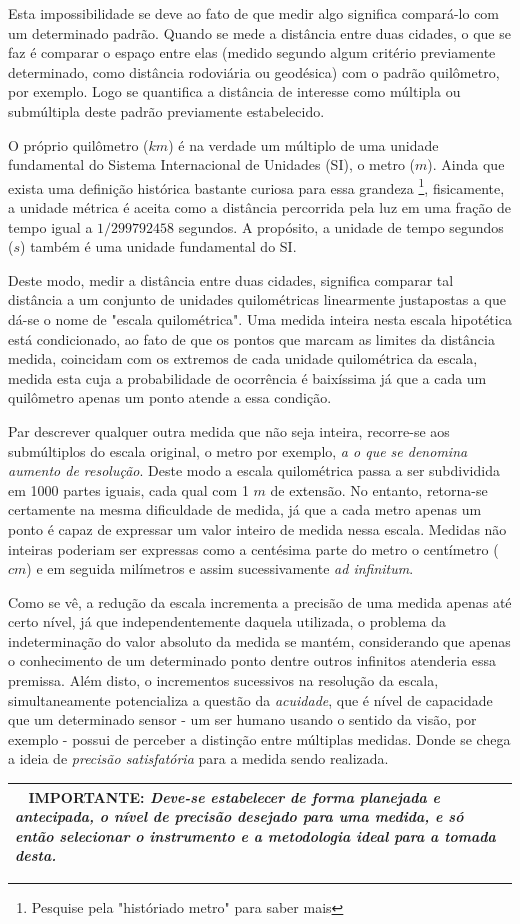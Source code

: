 \documentclass[a4paper, 11pt]{report}
\newenvironment{myboxed}
    {
        \begin{center}
        \begin{tabular}{p{0.7\textwidth}}
        \hline\
    }
    { 
        \\\hline
        \end{tabular} 
        \end{center}
    }
\begin{document}
Esta impossibilidade se deve ao fato de que medir algo significa compará-lo com
um determinado padrão. Quando se mede a distância entre duas cidades, o que se 
faz é comparar o espaço entre elas (medido segundo algum critério previamente
determinado, como distância rodoviária ou geodésica) com o padrão quilômetro, 
por exemplo. Logo se quantifica a distância de interesse como múltipla ou 
submúltipla deste padrão previamente estabelecido.

O próprio quilômetro ($km$) é na verdade um múltiplo de uma unidade fundamental 
do Sistema Internacional de Unidades (SI), o metro ($m$). Ainda que exista uma 
definição histórica bastante curiosa para essa grandeza \footnote{Pesquise pela 
"históriado metro" para saber mais}, fisicamente, a unidade métrica é aceita 
como a distância percorrida pela luz em uma fração de tempo igual a 
$1/299 792 458$ segundos. A propósito, a unidade de tempo segundos ($s$) também 
é uma unidade fundamental do SI. 

Deste modo, medir a distância entre duas cidades, significa comparar tal
distância a um conjunto de unidades quilométricas linearmente justapostas a que
dá-se o nome de "escala quilométrica". Uma medida inteira nesta escala hipotética
está condicionado, ao fato de que os pontos que marcam as limites da distância 
medida, coincidam com os extremos de cada unidade quilométrica da escala, medida
esta cuja a probabilidade de ocorrência é baixíssima já que a cada um quilômetro
apenas um ponto atende a essa condição. 

Par descrever qualquer outra medida que não seja inteira, recorre-se aos 
submúltiplos do escala original, o metro por exemplo, \emph{a o que se denomina 
aumento de resolução}. Deste modo a escala quilométrica passa a ser subdividida 
em 1000 partes iguais,  cada qual com 1 $m$ de extensão. No entanto, retorna-se 
certamente na mesma dificuldade de medida, já que a cada metro apenas um ponto 
é capaz de expressar um valor inteiro de medida nessa escala. Medidas não 
inteiras poderiam ser expressas como a centésima parte do metro o centímetro 
($cm$) e em seguida milímetros e assim sucessivamente \emph{ad infinitum}. 

Como se vê, a redução da escala incrementa a precisão de uma medida apenas até
certo nível, já que independentemente daquela utilizada, o problema da 
indeterminação do valor absoluto da medida se mantém, considerando que apenas
o conhecimento de um determinado ponto dentre outros infinitos atenderia essa 
premissa. Além disto, o incrementos sucessivos na resolução da escala, 
simultaneamente potencializa a questão da \emph{acuidade}, que é nível de 
capacidade que um determinado sensor - um ser humano usando o sentido da visão, 
por exemplo - possui de perceber a distinção entre múltiplas medidas. Donde se
chega a ideia de \emph{precisão satisfatória} para a medida sendo realizada. 
\newline 
\begin{myboxed}
    \textbf{IMPORTANTE:}
    \emph{
        Deve-se estabelecer de forma planejada e antecipada, o nível de precisão 
        desejado para uma medida, e só então selecionar o instrumento e 
        a metodologia ideal para a tomada desta.
    }
\end{myboxed}
\end{document}

